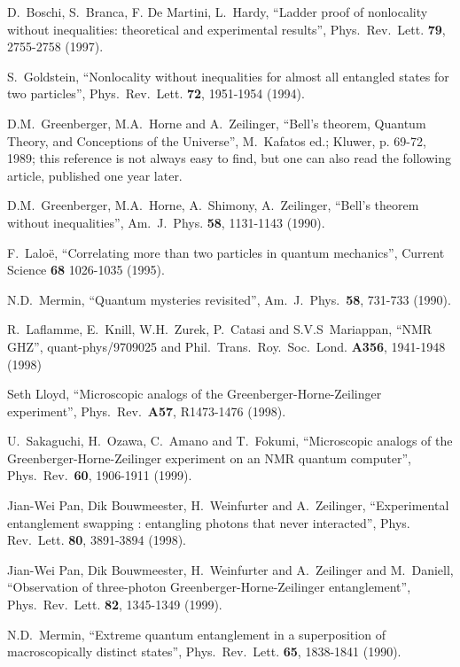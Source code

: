 \documentclass[12pt,onecolumn]{article}%
\begin{document}
\begin{thebibliography}{999}
D.\ Boschi, S.\ Branca, F. De Martini, L.\ Hardy, ``Ladder
proof of nonlocality without inequalities: theoretical and experimental
results'', Phys.\ Rev.\ Lett. \textbf{79}, 2755-2758 (1997).

S.\ Goldstein, ``Nonlocality without inequalities for
almost all entangled states for two particles'', Phys.\ Rev.\ Lett.
\textbf{72}, 1951-1954 (1994).

D.M.\ Greenberger, M.A.\ Horne and A.\ Zeilinger, ``Bell's
theorem, Quantum Theory, and Conceptions of the Universe'', M.\ Kafatos ed.;
Kluwer, p. 69-72, 1989; this reference is not always easy to find, but one can
also read the following article, published one year later.

D.M.\ Greenberger, M.A.\ Horne, A.\ Shimony, A.\ Zeilinger,
``Bell's theorem without inequalities'', Am.\ J.\ Phys. \textbf{58}, 1131-1143 (1990).

F.\ Lalo\"{e}, ``Correlating more than two particles in quantum
mechanics'', Current Science \textbf{68} 1026-1035 (1995).

N.D.\ Mermin, ``Quantum mysteries revisited'',
Am.\ J.\ Phys.\ \textbf{58}, 731-733 (1990).

R.\ Laflamme, E.\ Knill, W.H.\ Zurek, P.\ Catasi and
S.V.S\ Mariappan, ``NMR GHZ'', quant-phys/9709025 and
Phil.\ Trans.\ Roy.\ Soc.\ Lond. \textbf{A356}, 1941-1948 (1998)

Seth Lloyd, ``Microscopic analogs of the
Greenberger-Horne-Zeilinger experiment'', Phys.\ Rev.\ \textbf{A57},
R1473-1476 (1998).

U.\ Sakaguchi, H.\ Ozawa, C.\ Amano and T.\ Fokumi,
``Microscopic analogs of the Greenberger-Horne-Zeilinger experiment on an NMR
quantum computer'', Phys.\ Rev.\ \textbf{60}, 1906-1911 (1999).

Jian-Wei Pan, Dik Bouwmeester, H.\ Weinfurter and
A.\ Zeilinger, ``Experimental entanglement swapping : entangling photons that
never interacted'', Phys. Rev.\ Lett. \textbf{80}, 3891-3894 (1998).

Jian-Wei Pan, Dik Bouwmeester, H.\ Weinfurter and
A.\ Zeilinger and M.\ Daniell, ``Observation of three-photon
Greenberger-Horne-Zeilinger entanglement'', Phys.\ Rev.\ Lett. \textbf{82},
1345-1349 (1999).

N.D.\ Mermin, ``Extreme quantum entanglement in a
superposition of macroscopically distinct states'', Phys.\ Rev.\ Lett.
\textbf{65}, 1838-1841 (1990).


\end{thebibliography}
\end{document}
